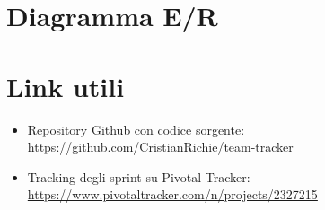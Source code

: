 \documentclass[a4paper,12pt]{extarticle}
\begin{document}



\section{Diagramma E/R}
%

\section{Link utili}
\begin{itemize}
    \item Repository Github con codice sorgente: \\ \href{https://github.com/CristianRichie/team-tracker}{https://github.com/CristianRichie/team-tracker}
    \item Tracking degli sprint su Pivotal Tracker: \\ \href{https://www.pivotaltracker.com/n/projects/2327215}{https://www.pivotaltracker.com/n/projects/2327215}
\end{itemize}
\end{document}
